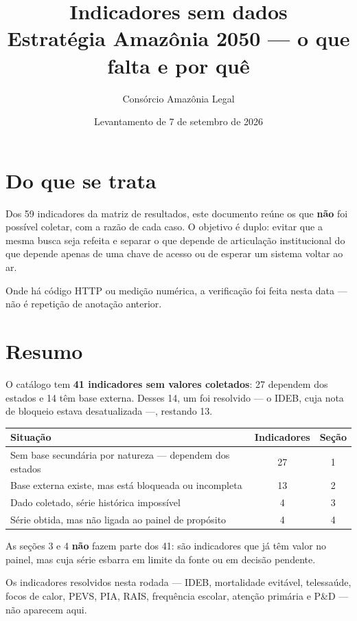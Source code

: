 \documentclass[11pt,a4paper]{article}
\title{Indicadores sem dados\\[0.3em]
  \large Estratégia Amazônia 2050 --- o que falta e por quê}
\author{Consórcio Amazônia Legal}
\date{Levantamento de 7 de setembro de 2026}
\begin{document}
\maketitle

\section*{Do que se trata}

Dos 59 indicadores da matriz de resultados, este documento reúne os que \textbf{não}
foi possível coletar, com a razão de cada caso. O objetivo é duplo: evitar que a mesma
busca seja refeita e separar o que depende de articulação institucional do que depende
apenas de uma chave de acesso ou de esperar um sistema voltar ao ar.

Onde há código HTTP ou medição numérica, a verificação foi feita nesta data --- não é
repetição de anotação anterior.

\section*{Resumo}

O catálogo tem \textbf{41 indicadores sem valores coletados}: 27 dependem dos estados e
14 têm base externa. Desses 14, um foi resolvido --- o IDEB, cuja nota de bloqueio
estava desatualizada ---, restando 13.

\begin{center}
\begin{tabular}{L{9.5cm} c c}
\toprule
\textbf{Situação} & \textbf{Indicadores} & \textbf{Seção} \\
\midrule
Sem base secundária por natureza --- dependem dos estados & 27 & 1 \\
Base externa existe, mas está bloqueada ou incompleta & 13 & 2 \\
Dado coletado, série histórica impossível & 4 & 3 \\
Série obtida, mas não ligada ao painel de propósito & 4 & 4 \\
\bottomrule
\end{tabular}
\end{center}

As seções 3 e 4 \textbf{não} fazem parte dos 41: são indicadores que já têm valor no
painel, mas cuja série esbarra em limite da fonte ou em decisão pendente.

Os indicadores resolvidos nesta rodada --- IDEB, mortalidade evitável, telessaúde,
focos de calor, PEVS, PIA, RAIS, frequência escolar, atenção primária e P\&D --- não
aparecem aqui.
\end{document}
